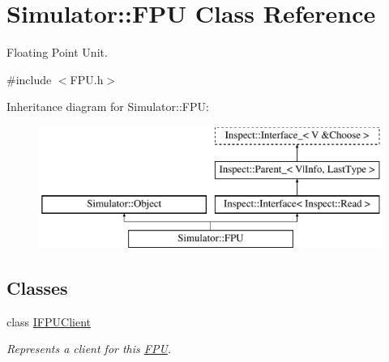 \hypertarget{class_simulator_1_1_f_p_u}{\section{Simulator\+:\+:F\+P\+U Class Reference}
\label{class_simulator_1_1_f_p_u}
}


Floating Point Unit.  




{\ttfamily \#include $<$F\+P\+U.\+h$>$}

Inheritance diagram for Simulator\+:\+:F\+P\+U\+:\begin{figure}[H]
\begin{center}
\leavevmode
\includegraphics[height=4.000000cm]{class_simulator_1_1_f_p_u}
\end{center}
\end{figure}
\subsection*{Classes}
\begin{DoxyCompactItemize}
\item 
class \hyperlink{class_simulator_1_1_f_p_u_1_1_i_f_p_u_client}{I\+F\+P\+U\+Client}
\begin{DoxyCompactList}\small\item\em Represents a client for this \hyperlink{class_simulator_1_1_f_p_u}{F\+P\+U}. \end{DoxyCompactList}\end{DoxyCompactItemize}
